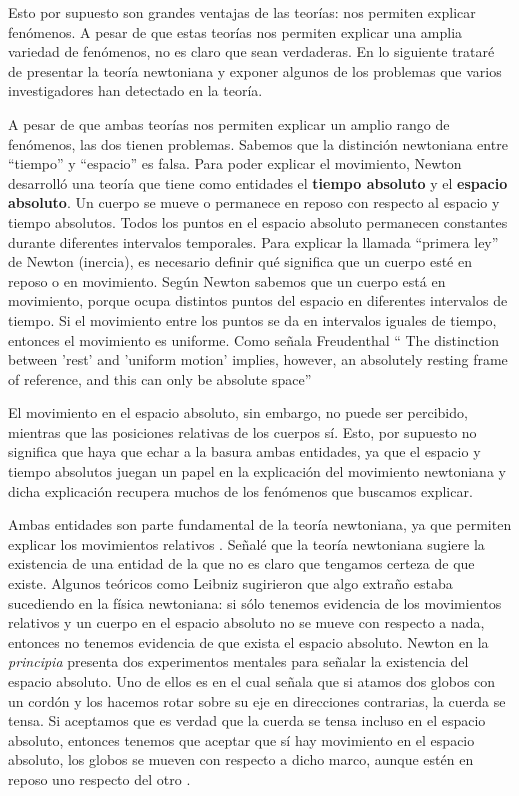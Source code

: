 \documentclass[12pt]{article}
\begin{document}
Esto por supuesto son grandes ventajas de las teorías: nos permiten explicar fenómenos. A pesar de que estas teorías nos permiten explicar una amplia variedad de fenómenos, no es claro que sean verdaderas. En lo siguiente trataré de presentar la teoría newtoniana y exponer algunos de los problemas que varios investigadores han detectado en la teoría.

A pesar de que ambas teorías nos permiten explicar un amplio rango de fenómenos, las dos tienen problemas. Sabemos que la distinción newtoniana entre ``tiempo'' y ``espacio'' es falsa. Para poder explicar el movimiento, Newton desarrolló una teoría que tiene como entidades el \textbf{tiempo absoluto} y el \textbf{espacio absoluto}. Un cuerpo se mueve o permanece en reposo con respecto al espacio y tiempo absolutos. Todos los puntos en el espacio absoluto permanecen constantes durante diferentes intervalos temporales. Para explicar la llamada ``primera ley''  de Newton (inercia), es necesario definir qué significa que un cuerpo esté en reposo o en movimiento. Según Newton sabemos que un cuerpo está en movimiento, porque ocupa distintos puntos del espacio en diferentes intervalos de tiempo. Si el movimiento entre los puntos se da en intervalos iguales de tiempo, entonces el movimiento es uniforme. Como señala Freudenthal `` The distinction between 'rest' and 'uniform motion' implies, however, an absolutely resting frame of reference, and this can only be absolute space'' \citeyear{Freudenthal1986}

El movimiento en el espacio absoluto, sin embargo, no puede ser percibido, mientras que las posiciones relativas de los cuerpos sí. Esto, por supuesto no significa que haya que echar a la basura ambas entidades, ya que el espacio y tiempo absolutos juegan un papel en la explicación del movimiento newtoniana y dicha explicación recupera muchos de los fenómenos que buscamos explicar.

Ambas entidades son parte fundamental de la teoría newtoniana, ya que permiten explicar los movimientos relativos \cite{Maudlin2014Filosofia:7985}. Señalé que la teoría newtoniana sugiere la existencia de una entidad de la que no es claro que tengamos certeza de que existe. Algunos teóricos como Leibniz sugirieron que algo extraño estaba sucediendo en la física newtoniana: si sólo tenemos evidencia de los movimientos relativos y un cuerpo en el espacio absoluto no se mueve con respecto a nada, entonces no tenemos evidencia de que exista el espacio absoluto. Newton en la \textit{principia} presenta dos experimentos mentales para señalar la existencia del espacio absoluto. Uno de ellos es en el cual señala que si atamos dos globos con un cordón y los hacemos rotar sobre su eje en direcciones contrarias, la cuerda se tensa. Si aceptamos que es verdad que la cuerda se tensa incluso en el espacio absoluto, entonces tenemos que aceptar que sí hay movimiento en el espacio absoluto, los globos se mueven con respecto a dicho marco, aunque estén en reposo uno respecto del otro \cite[pp. 6-12]{book:360820}.
\end{document}
